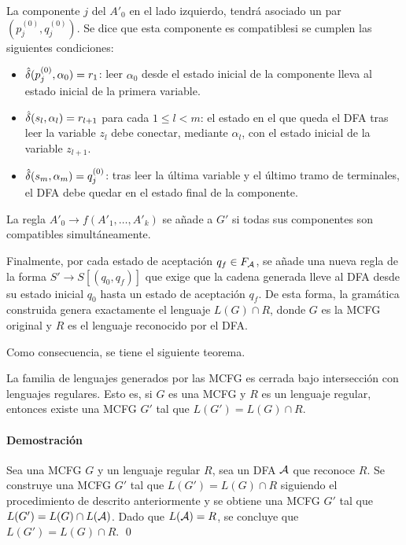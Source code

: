 La componente $j$ del $A'_0$ en el lado izquierdo, tendrá asociado un par $(p_j^{(0)}, q_j^{(0)})$. Se dice que esta componente es \lquoti compatible\rquoti \space si se cumplen las siguientes condiciones:

\begin{itemize}
    \item $\hat{\delta}(p_j^{(0)}, \alpha_0) = r_1$: leer $\alpha_0$ desde el estado inicial de la componente lleva al estado inicial de la primera variable.
    \item $\hat{\delta}(s_l, \alpha_l) = r_{l+1}$ para cada $1 \leq l < m$: el estado en el que queda el DFA tras leer la variable $z_l$ debe conectar, mediante $\alpha_l$, con el estado inicial de la variable $z_{l+1}$.
    \item $\hat{\delta}(s_m, \alpha_m) = q_j^{(0)}$: tras leer la última variable y el último tramo de terminales, el DFA debe quedar en el estado final de la componente.
\end{itemize}

La regla $A'_0 \to f(A'_1, \dots, A'_k)$ se añade a $G'$ si todas sus componentes son compatibles simultáneamente.


Finalmente, por cada estado de aceptación $q_f \in F_{\mathcal{A}}$, se añade una nueva regla de la forma $S' \to S[(q_0, q_f)]$ que exige que la cadena generada lleve al DFA desde su estado inicial $q_0$ hasta un estado de aceptación $q_f$. De esta forma, la gramática construida genera exactamente el lenguaje $L(G) \cap R$, donde $G$ es la MCFG original y $R$ es el lenguaje reconocido por el DFA.

Como consecuencia, se tiene el siguiente teorema.

\begin{theorem}
    \label{thm:mcfg-reg}
    La familia de lenguajes generados por las MCFG es cerrada bajo intersección con lenguajes regulares. Esto es, si $G$ es una MCFG y $R$ es un lenguaje regular, entonces existe una MCFG $G'$ tal que $L(G') = L(G) \cap R$.
\end{theorem}

\paragraph{Demostración} Sea una MCFG $G$ y un lenguaje regular $R$, sea un DFA $\mathcal{A}$ que reconoce $R$. Se construye una MCFG $G'$ tal que $L(G') = L(G) \cap R$ siguiendo el procedimiento de \cite{Seki1991OnMC} descrito anteriormente y se obtiene una MCFG $G'$ tal que $L(G') = L(G) \cap L(\mathcal{A})$. Dado que $L(\mathcal{A}) = R$, se concluye que $L(G') = L(G) \cap R$. \qed

